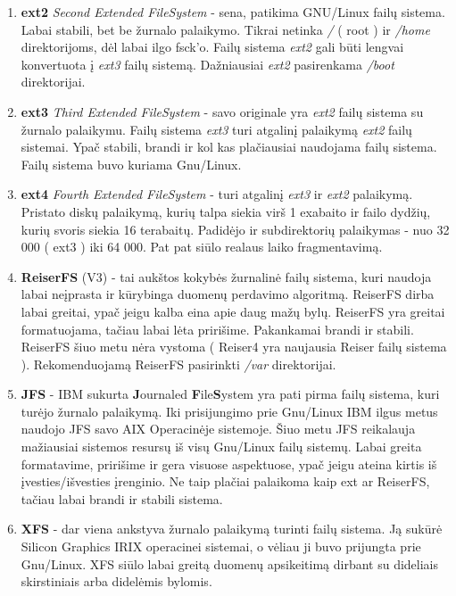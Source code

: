 \begin{enumerate}

  \item \textbf{ext2} \textsl{Second Extended FileSystem} - sena,
    patikima GNU/Linux failų sistema. Labai stabili, bet be žurnalo
    palaikymo. Tikrai netinka \textsl{/} ( root ) ir \textsl{/home}
    direktorijoms, dėl labai ilgo fsck'o. Failų sistema \textsl{ext2}
    gali būti lengvai konvertuota į \textsl{ext3} failų
    sistemą. Dažniausiai \textsl{ext2} pasirenkama \textsl{/boot}
    direktorijai.
  \item \textbf{ext3} \textsl{Third Extended FileSystem} - savo
    originale yra \textsl{ext2} failų sistema su žurnalo
    palaikymu. Failų sistema \textsl{ext3} turi atgalinį palaikymą
    \textsl{ext2} failų sistemai. Ypač stabili, brandi ir kol kas
    plačiausiai naudojama failų sistema. Failų sistema buvo kuriama
    Gnu/Linux.
  \item \textbf{ext4} \textsl{Fourth Extended FileSystem} - turi
    atgalinį \textsl{ext3} ir \textsl{ext2} palaikymą. Pristato diskų
    palaikymą, kurių talpa siekia virš 1 exabaito ir failo dydžių,
    kurių svoris siekia 16 terabaitų. Padidėjo ir subdirektorių
    palaikymas - nuo 32 000 ( ext3 ) iki 64 000. Pat pat siūlo realaus
    laiko fragmentavimą.
  \item \textbf{ReiserFS} (V3) - tai aukštos kokybės žurnalinė failų
    sistema, kuri naudoja labai neįprasta ir kūrybinga duomenų
    perdavimo algoritmą. ReiserFS dirba labai greitai, ypač jeigu
    kalba eina apie daug mažų bylų. ReiserFS yra greitai formatuojama,
    tačiau labai lėta pririšime. Pakankamai brandi ir
    stabili. ReiserFS šiuo metu nėra vystoma ( Reiser4 yra naujausia
    Reiser failų sistema ). Rekomenduojamą ReiserFS pasirinkti
    \textsl{/var} direktorijai.
  \item \textbf{JFS} - IBM sukurta \textbf{J}ournaled
    \textbf{F}ile\textbf{S}ystem yra pati pirma failų sistema, kuri
    turėjo žurnalo palaikymą. Iki prisijungimo prie Gnu/Linux IBM
    ilgus metus naudojo JFS savo AIX Operacinėje sistemoje. Šiuo metu
    JFS reikalauja mažiausiai sistemos resursų iš visų Gnu/Linux failų
    sistemų. Labai greita formatavime, pririšime ir gera visuose
    aspektuose, ypač jeigu ateina kirtis iš įvesties/išvesties
    įrenginio. Ne taip plačiai palaikoma kaip ext ar ReiserFS, tačiau
    labai brandi ir stabili sistema.
  \item \textbf{XFS} - dar viena ankstyva žurnalo palaikymą turinti
    failų sistema. Ją sukūrė Silicon Graphics IRIX operacinei
    sistemai, o vėliau ji buvo prijungta prie Gnu/Linux. XFS siūlo
    labai greitą duomenų apsikeitimą dirbant su dideliais skirstiniais
    arba didelėmis bylomis.

\end{enumerate}

